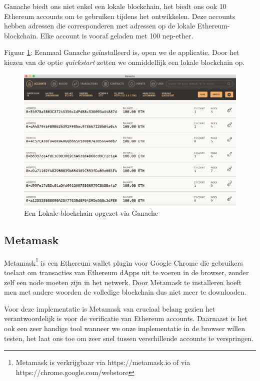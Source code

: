 	Ganache biedt ons  niet enkel een lokale blockchain, het biedt ons ook 10 Ethereum accounts om te gebruiken tijdens het ontwikkelen. Deze accounts hebben adressen die corresponderen met adressen op de lokale Ethereum-blockchain. Elke account is vooraf geladen met 100 nep-ether.
	
	Figuur \ref{fig:ganache-blockchain}: Eenmaal Ganache geïnstalleerd is, open we de applicatie. Door het kiezen van de optie \textit{quickstart} zetten we onmiddellijk een lokale blockchain op. 
	
	\begin{figure}
		\includegraphics[width=\linewidth]{img/ganache-blockchain.png}
		\caption{Een Lokale blockchain opgezet via Ganache}
		\label{fig:ganache-blockchain}
	\end{figure}
	
	
	\subsection{Metamask}
	Metamask\footnote{Metamask is verkrijgbaar via https://metamask.io of via https://chrome.google.com/webstore} is een Ethereum wallet plugin voor Google Chrome die gebruikers toelaat om transacties van Ethereum dApps uit te voeren in de browser, zonder zelf een node moeten zijn in het netwerk. Door Metamask te installeren hoeft men met andere woorden de volledige blockchain dus niet meer te downloaden. 
	
	Voor deze implementatie is Metamask van cruciaal belang gezien het verantwoordelijk is voor de verificatie van Ethereum accounts. Daarnaast is het ook een zeer handige tool wanneer we onze implementatie in de browser willen testen, het laat ons toe om zeer snel tussen verschillende accounts te verspringen.
	

